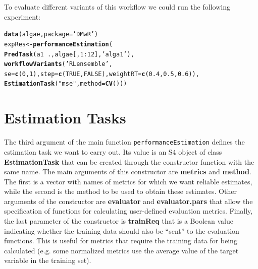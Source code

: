 \documentclass[10pt,a4paper]{article}\usepackage[]{graphicx}\usepackage[]{color}
\makeatletter
\newcommand{\hlnum}[1]{\textcolor[rgb]{0.686,0.059,0.569}{#1}}%
\newcommand{\hlstr}[1]{\textcolor[rgb]{0.192,0.494,0.8}{#1}}%
\newcommand{\hlopt}[1]{\textcolor[rgb]{0,0,0}{#1}}%
\newcommand{\hlstd}[1]{\textcolor[rgb]{0.345,0.345,0.345}{#1}}%
\newcommand{\hlkwb}[1]{\textcolor[rgb]{0.69,0.353,0.396}{#1}}%
\newcommand{\hlkwc}[1]{\textcolor[rgb]{0.333,0.667,0.333}{#1}}%
\newcommand{\hlkwd}[1]{\textcolor[rgb]{0.737,0.353,0.396}{\textbf{#1}}}%
\newenvironment{kframe}{%
 \def\at@end@of@kframe{}%
 \ifinner\ifhmode%
  \def\at@end@of@kframe{\end{minipage}}%
  \begin{minipage}{\columnwidth}%
 \fi\fi%
 \def\FrameCommand##1{\hskip\@totalleftmargin \hskip-\fboxsep
 \colorbox{shadecolor}{##1}\hskip-\fboxsep
     \hskip-\linewidth \hskip-\@totalleftmargin \hskip\columnwidth}%
 \MakeFramed {\advance\hsize-\width
   \@totalleftmargin\z@ \linewidth\hsize
   \@setminipage}}%
 {\par\unskip\endMakeFramed%
 \at@end@of@kframe}
\newenvironment{knitrout}{}{} %
\makeatother
\begin{document}
To evaluate different variants of this workflow we could run the
following experiment:

\begin{knitrout}\footnotesize
{}\color{fgcolor}\begin{kframe}
\begin{alltt}
\hlkwd{data}\hlstd{(algae,}\hlkwc{package}\hlstd{=}\hlstr{'DMwR'}\hlstd{)}
\hlstd{expRes} \hlkwb{<-} \hlkwd{performanceEstimation}\hlstd{(}
    \hlkwd{PredTask}\hlstd{(a1} \hlopt{~} \hlstd{.,algae[,}\hlnum{1}\hlopt{:}\hlnum{12}\hlstd{],}\hlstr{'alga1'}\hlstd{),}
    \hlkwd{workflowVariants}\hlstd{(}\hlstr{'RLensemble'}\hlstd{,}
                     \hlkwc{se}\hlstd{=}\hlkwd{c}\hlstd{(}\hlnum{0}\hlstd{,}\hlnum{1}\hlstd{),}\hlkwc{step}\hlstd{=}\hlkwd{c}\hlstd{(}\hlnum{TRUE}\hlstd{,}\hlnum{FALSE}\hlstd{),}\hlkwc{weightRT}\hlstd{=}\hlkwd{c}\hlstd{(}\hlnum{0.4}\hlstd{,}\hlnum{0.5}\hlstd{,}\hlnum{0.6}\hlstd{)),}
    \hlkwd{EstimationTask}\hlstd{(}\hlstr{"mse"}\hlstd{,}\hlkwc{method}\hlstd{=}\hlkwd{CV}\hlstd{()))}
\end{alltt}
\end{kframe}
\end{knitrout}


\section{Estimation Tasks}

The third argument of the main function \texttt{performanceEstimation} defines the estimation task we want to carry out. Its value is an S4 object of class \textbf{EstimationTask} that can be created through the constructor function with the same name. The main arguments of this constructor are \textbf{metrics} and \textbf{method}. The first is a vector with names of metrics for which we want reliable estimates, while the second is the method to be used to obtain these estimates. Other arguments of the constructor are \textbf{evaluator} and \textbf{evaluator.pars} that allow the specification of functions for calculating user-defined evaluation metrics. Finally, the last parameter of the constructor is \textbf{trainReq} that is a Boolean value indicating whether the training data should also be ``sent'' to the evaluation functions. This is useful for metrics that require the training data for being calculated (e.g. some normalized metrics use the average value of the target variable in the training set).
\end{document}
